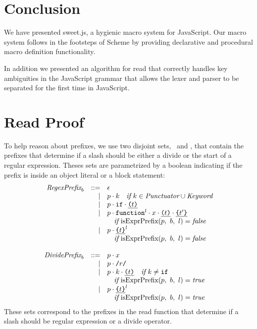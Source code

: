 \documentclass[preprint,10pt]{sigplanconf}
\begin{document}
\section{Conclusion}

We have presented sweet.js, a hygienic macro system for JavaScript. Our macro system follows in the footsteps of Scheme by providing declarative and procedural macro definition functionality.

In addition we presented an algorithm for read that correctly handles key ambiguities in the JavaScript grammar that allows the lexer and parser to be separated for the first time in JavaScript.




\appendix

\clearpage

\section{Read Proof}
\label{sec:readproof}


To help reason about prefixes,
we use two disjoint sets, \reprefix~and \divprefix, that
contain the prefixes that determine if a slash should be
either a divide or the start of a regular expression. Theses sets are parametrized by a boolean indicating if the prefix is inside an object literal or a block statement:
\[
\begin{array}{rrl}
\textit{RegexPrefix}_b &::=& \epsilon
\\
&|& p \cdot k \quad \textit{if}~k \in \textit{Punctuator} \cup \textit{Keyword}
\\
&|& p \cdot \texttt{if} \cdot \underline{ \texttt{(} t \texttt{)}}
\\
&|& p \cdot \texttt{function}^l \cdot x \cdot \underline{ \texttt{(} t \texttt{)}} \cdot \underline{ \texttt{\{} t' \texttt{\}} }
\\
&& \quad \textit{if}~\textrm{isExprPrefix}(p,~b,~l) = \textit{false}
\\
&|& p \cdot \underline{ \texttt{\{} t \texttt{\}} }^l
\\
&& \quad \textit{if}~\textrm{isExprPrefix}(p,~b,~l) = \textit{false}

\\ \\
\textit{DividePrefix}_b &::=& p \cdot x
\\
&|& p \cdot \texttt{/}r\texttt{/}
\\
&|& p \cdot k \cdot \underline{ \texttt{(} t \texttt{)}} \quad \textit{if}~k \not = \texttt{if}
\\
&& \quad \textit{if}~\textrm{isExprPrefix}(p,~b,~l) = \textit{true}
\\
&|& p \cdot \underline{ \texttt{\{} t \texttt{\}} }^l
\\
&& \quad \textit{if}~\textrm{isExprPrefix}(p,~b,~l) = \textit{true}
\end{array}
\]
These sets correspond to the prefixes 
in the read function that determine if a slash should be regular expression or a divide operator.
\end{document}
